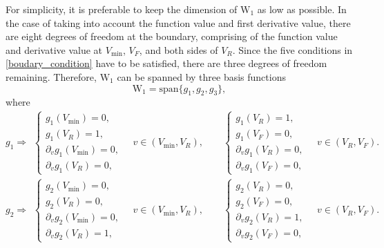 For simplicity, it is preferable to keep the dimension of $\mathrm{W}_1$ as low as possible. In the case of taking into account the function value and first derivative value, there are eight degrees of freedom at the boundary, comprising of the function value and derivative value at $V_{\min}$, $V_F$, and both sides of $V_R$. Since the five conditions in \eqref{boudary_condition} have to be satisfied, there are three degrees of freedom remaining. Therefore, $\mathrm{W}_1$ can be spanned by three basis functions
\begin{equation}
    \mathrm{W}_1=\text{span}\{g_1,g_2,g_3\},
\end{equation}
where
\begin{equation}
    g_1\Rightarrow
    \begin{gathered}
        \begin{cases}
            g_1(V_{\min})=0,\\
            g_1(V_R)=1,\\
            \partial_v g_1(V_{\min})=0,\\
            \partial_v g_1(V_R)=0,
        \end{cases}\quad v\in(V_{\min},V_R),\qquad
        \begin{cases}
            g_1(V_R)=1,\\
            g_1(V_F)=0,\\
            \partial_v g_1(V_R)=0,\\
            \partial_v g_1(V_F)=0,
        \end{cases}\quad v\in(V_R,V_F).
    \end{gathered}
\end{equation}
\begin{equation}
    g_2\Rightarrow
    \begin{gathered}
        \begin{cases}
            g_2(V_{\min})=0,\\
            g_2(V_R)=0,\\
            \partial_v g_2(V_{\min})=0,\\
            \partial_v g_2(V_R)=1,
        \end{cases}\quad v\in(V_{\min},V_R), \qquad
        \begin{cases}
            g_2(V_R)=0,\\
            g_2(V_F)=0,\\
            \partial_v g_2(V_R)=1,\\
            \partial_v g_2(V_F)=0,
        \end{cases}\quad v\in(V_R,V_F).
    \end{gathered}
\end{equation}
